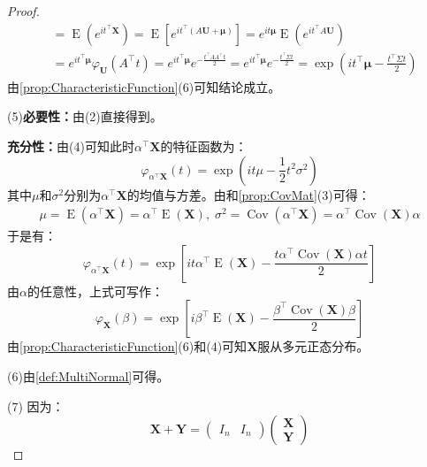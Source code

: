 \begin{proof}
\begin{align*}
		&=\operatorname{E}(e^{it^{\top}\mathbf{X}})
		=\operatorname{E}[e^{it^{\top}(A\mathbf{U}+\boldsymbol{\mu})}]
		=e^{it\boldsymbol{\mu}}\operatorname{E}(e^{it^{\top}A\mathbf{U}}) \\
		&=e^{it^{\top}\boldsymbol{\mu}}\varphi_\mathbf{U}(A^{\top}t)
		=e^{it^{\top}\boldsymbol{\mu}}e^{-\frac{t^{\top}AA^{\top}t}{2}}
		=e^{it^{\top}\boldsymbol{\mu}}e^{-\frac{t^{\top}\Sigma t}{2}}
		=\exp\left(it^{\top}\boldsymbol{\mu}-\frac{t^{\top}\Sigma t}{2}\right)
	\end{align*}
	由\cref{prop:CharacteristicFunction}(6)可知结论成立。\par
	(5)\textbf{必要性：}由(2)直接得到。\par
	\textbf{充分性：}由(4)可知此时$\alpha^{\top}\mathbf{X}$的特征函数为：
	\begin{equation*}
		\varphi_{\alpha^{\top}\mathbf{X}}(t)=\exp\left(it\mu-\frac{1}{2}t^2\sigma^2\right)
	\end{equation*}
	其中$\mu$和$\sigma^2$分别为$\alpha^{\top}\mathbf{X}$的均值与方差。由和\cref{prop:CovMat}(3)可得：
	\begin{gather*}
		\mu=\operatorname{E}(\alpha^{\top}\mathbf{X})=\alpha^{\top}\operatorname{E}(\mathbf{X}),\;
		\sigma^2=\operatorname{Cov}(\alpha^{\top}\mathbf{X})=\alpha^{\top}\operatorname{Cov}(\mathbf{X})\alpha
	\end{gather*}
	于是有：
	\begin{equation*}
		\varphi_{\alpha^{\top}\mathbf{X}}(t)=\exp\left[it\alpha^{\top}\operatorname{E}(\mathbf{X})-\frac{t\alpha^{\top}\operatorname{Cov}(\mathbf{X})\alpha t}{2}\right]
	\end{equation*}
	由$\alpha$的任意性，上式可写作：
	\begin{equation*}
		\varphi_{\mathbf{X}}(\beta)=\exp\left[i\beta^{\top}\operatorname{E}(\mathbf{X})-\frac{\beta^{\top}\operatorname{Cov}(\mathbf{X})\beta}{2}\right]
	\end{equation*}
	由\cref{prop:CharacteristicFunction}(6)和(4)可知$\mathbf{X}$服从多元正态分布。\par
	(6)由\cref{def:MultiNormal}可得。\par
	(7)	因为：
	\begin{equation*}
		\mathbf{X}+\mathbf{Y}=
		\begin{pmatrix}
			I_n & I_n
		\end{pmatrix}
		\begin{pmatrix}
			\mathbf{X} \\
			\mathbf{Y}
		\end{pmatrix}

\end{equation*}
\end{proof}
